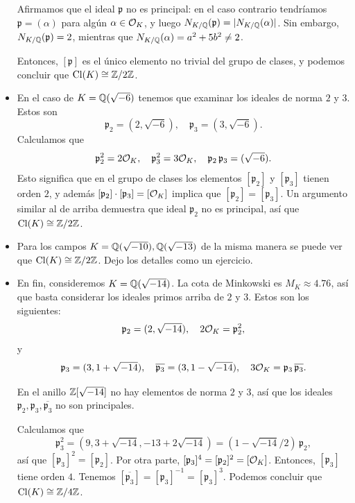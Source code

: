 \begin{ejemplo}
\begin{itemize}
    Afirmamos que el ideal $\mathfrak{p}$ no es principal: en el caso contrario
    tendríamos $\mathfrak{p} = (\alpha)$ para algún $\alpha \in \mathcal{O}_K$,
    y luego $N_{K/\mathbb{Q}} (\mathfrak{p}) = |N_{K/\mathbb{Q}} (\alpha)|$. Sin embargo,
    $N_{K/\mathbb{Q}} (\mathfrak{p}) = 2$, mientras que
    $N_{K/\mathbb{Q}} (\alpha) = a^2 + 5b^2 \ne 2$.

    Entonces, $[\mathfrak{p}]$ es el único elemento no trivial del grupo de
    clases, y podemos concluir que $\operatorname{Cl} (K) \cong \mathbb{Z}/2\mathbb{Z}$.

  \item En el caso de $K = \mathbb{Q} (\sqrt{-6})$ tenemos que examinar los ideales de
    norma $2$ y $3$. Estos son
    $$\mathfrak{p}_2 = (2, \sqrt{-6}), \quad \mathfrak{p}_3 = (3, \sqrt{-6}).$$
    Calculamos que
    \[ \mathfrak{p}_2^2 = 2\mathcal{O}_K, \quad
       \mathfrak{p}_3^2 = 3\mathcal{O}_K, \quad
       \mathfrak{p}_2\,\mathfrak{p}_3 = (\sqrt{-6}). \]
    Esto significa que en el grupo de clases los elementos $[\mathfrak{p}_2]$
    y $[\mathfrak{p}_3]$ tienen orden $2$, y además
    $[\mathfrak{p}_2]\cdot [\mathfrak{p}_3] = [\mathcal{O}_K]$ implica que    
    $[\mathfrak{p}_2] = [\mathfrak{p}_3]$. Un argumento similar al de arriba
    demuestra que ideal $\mathfrak{p}_2$ no es principal, así que
    $\operatorname{Cl} (K) \cong \mathbb{Z}/2\mathbb{Z}$.

  \item Para los campos $K = \mathbb{Q} (\sqrt{-10}), \mathbb{Q} (\sqrt{-13})$ de la misma
    manera se puede ver que $\operatorname{Cl} (K) \cong \mathbb{Z}/2\mathbb{Z}$. Dejo los detalles como
    un ejercicio.

  \item En fin, consideremos $K = \mathbb{Q} (\sqrt{-14})$. La cota de Minkowski es
    $M_K \approx 4.76$, así que basta considerar los ideales primos arriba de
    $2$ y $3$. Estos son los siguientes:
    $$\mathfrak{p}_2 = (2, \sqrt{-14}), \quad 2\mathcal{O}_K = \mathfrak{p}_2^2,$$
    y
    \[ \mathfrak{p}_3 = (3, 1 + \sqrt{-14}), \quad
       \overline{\mathfrak{p}_3} = (3, 1 - \sqrt{-14}), \quad
       3\mathcal{O}_K = \mathfrak{p}_3\,\overline{\mathfrak{p}_3}. \]

    En el anillo $\mathbb{Z} [\sqrt{-14}]$ no hay elementos de norma $2$ y $3$, así que
    los ideales $\mathfrak{p}_2, \mathfrak{p}_3, \overline{\mathfrak{p}_3}$ no
    son principales.

    Calculamos que
    \[ \mathfrak{p}_3^2 = (9, 3 + \sqrt{-14}, -13 + 2\sqrt{-14}) =
       (1 - \sqrt{-14}/2) \, \mathfrak{p}_2, \]
    así que $[\mathfrak{p}_3]^2 = [\mathfrak{p}_2]$. Por otra parte,
    $[\mathfrak{p}_3]^4 = [\mathfrak{p}_2]^2 = [\mathcal{O}_K]$. Entonces,
    $[\mathfrak{p}_3]$ tiene orden $4$. Tenemos
    $[\overline{\mathfrak{p}_3}] = [\mathfrak{p}_3]^{-1} = [\mathfrak{p}_3]^3$.
    Podemos concluir que $\operatorname{Cl} (K) \cong \mathbb{Z}/4\mathbb{Z}$. \qedhere
  \end{itemize}
\end{ejemplo}

